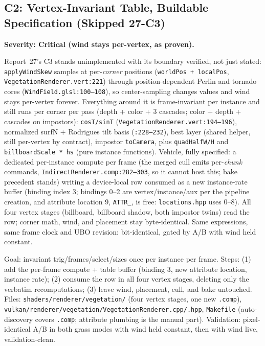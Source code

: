\documentclass[11pt,a4paper]{article}
\begin{document}
\subsection{C2: Vertex-Invariant Table, Buildable Specification (Skipped 27-C3)}
\label{sec:c2}

\textbf{Severity: Critical (wind stays per-vertex, as proven).}

Report~27's C3 stands unimplemented with its boundary verified, not just
stated: \texttt{applyWindSkew} samples at per-\emph{corner} positions
(\texttt{worldPos + localPos}, \texttt{VegetationRenderer.vert:221})
through position-dependent Perlin and tornado cores
(\texttt{WindField.glsl:100--108}), so center-sampling changes values and
wind stays per-vertex forever. Everything around it is frame-invariant per
instance and still runs per corner per pass (depth + color + 3 cascades;
color + depth + cascades on impostors): \texttt{cosT/sinT}
(\texttt{VegetationRenderer.vert:194--196}), normalized surfN + Rodrigues
tilt basis (\texttt{:228--232}), best layer (shared helper, still
per-vertex by contract), impostor \texttt{toCamera}, plus
\texttt{quadHalfW/H} and \texttt{billboardScale * hs} (pure instance
functions). Vehicle, fully specified: a dedicated per-instance compute per
frame (the merged cull emits per-\emph{chunk} commands,
\texttt{IndirectRenderer.comp:282--303}, so it cannot host this; bake
precedent stands) writing a device-local row consumed as a new
instance-rate buffer (binding index 3; bindings 0--2 are vertex/instance/aux
per the pipeline creation, and attribute location 9, \texttt{ATTR\_},
is free: \texttt{locations.hpp} uses 0--8). All four vertex stages
(billboard, billboard shadow, both impostor twins) read the row; corner
math, wind, and placement stay byte-identical. Same expressions, same
frame clock and UBO revision: bit-identical, gated by A/B with wind held
constant.

\begin{tcolorbox}[promptbox={Prompt --- C2: vertex-invariant table, specified}]
Goal: invariant trig/frames/select/sizes once per instance per frame.
Steps: (1) add the per-frame compute + table buffer (binding 3, new
attribute location, instance rate); (2) consume the row in all four vertex
stages, deleting only the verbatim recomputations; (3) leave wind,
placement, cull, and bake untouched. Files:
\texttt{shaders/renderer/vegetation/} (four vertex stages, one new
\texttt{.comp}), \texttt{vulkan/renderer/vegetation/VegetationRenderer.cpp/.hpp},
\texttt{Makefile} (auto-discovery covers \texttt{.comp}; attribute plumbing
is the manual part). Validation: pixel-identical A/B in both grass modes
with wind held constant, then with wind live, validation-clean.
\end{tcolorbox}
\end{document}
